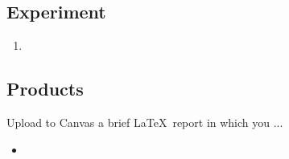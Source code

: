 \documentclass[11pt]{article}
\begin{document}
    
\subsection*{Experiment}

\begin{enumerate}
\item 
\end{enumerate}

\subsection*{Products}

Upload to Canvas a brief \LaTeX\ report in which you ...
\begin{itemize}
\item 
\end{itemize}
\end{document}
